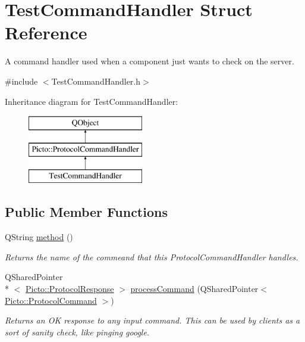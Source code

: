 \hypertarget{struct_test_command_handler}{\section{Test\-Command\-Handler Struct Reference}
\label{struct_test_command_handler}
}


A command handler used when a component just wants to check on the server.  




{\ttfamily \#include $<$Test\-Command\-Handler.\-h$>$}

Inheritance diagram for Test\-Command\-Handler\-:\begin{figure}[H]
\begin{center}
\leavevmode
\includegraphics[height=3.000000cm]{struct_test_command_handler}
\end{center}
\end{figure}
\subsection*{Public Member Functions}
\begin{DoxyCompactItemize}
\item 
\hypertarget{struct_test_command_handler_af506870768f03db6a6da328fe5955c3a}{Q\-String \hyperlink{struct_test_command_handler_af506870768f03db6a6da328fe5955c3a}{method} ()}\label{struct_test_command_handler_af506870768f03db6a6da328fe5955c3a}

\begin{DoxyCompactList}\small\item\em Returns the name of the commeand that this Protocol\-Command\-Handler handles. \end{DoxyCompactList}\item 
\hypertarget{struct_test_command_handler_ad26eab758f1b47d4046cdc90d73d3282}{Q\-Shared\-Pointer\\*
$<$ \hyperlink{struct_picto_1_1_protocol_response}{Picto\-::\-Protocol\-Response} $>$ \hyperlink{struct_test_command_handler_ad26eab758f1b47d4046cdc90d73d3282}{process\-Command} (Q\-Shared\-Pointer$<$ \hyperlink{struct_picto_1_1_protocol_command}{Picto\-::\-Protocol\-Command} $>$)}\label{struct_test_command_handler_ad26eab758f1b47d4046cdc90d73d3282}

\begin{DoxyCompactList}\small\item\em Returns an O\-K response to any input command. This can be used by clients as a sort of sanity check, like pinging google. \end{DoxyCompactList}\end{DoxyCompactItemize}


